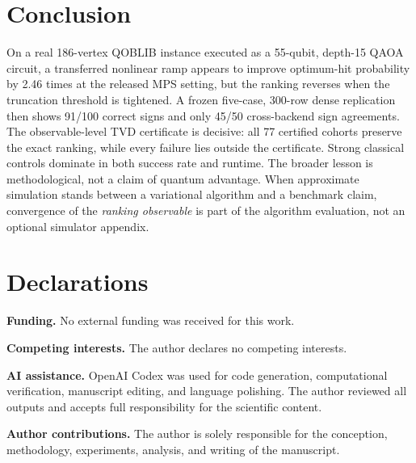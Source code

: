 \documentclass[10pt,twocolumn]{article}
\begin{document}
\section{Conclusion}

On a real 186-vertex QOBLIB instance executed as a 55-qubit, depth-15 QAOA
circuit, a transferred nonlinear ramp appears to improve optimum-hit
probability by 2.46 times at the released MPS setting, but the ranking reverses
when the truncation threshold is tightened. A frozen five-case, 300-row dense
replication then shows 91/100 correct signs and only 45/50 cross-backend sign
agreements. The observable-level TVD certificate is decisive: all 77 certified
cohorts preserve the exact ranking, while every failure lies outside the
certificate. Strong classical controls dominate in both success rate and
runtime. The broader lesson is methodological, not a claim of quantum
advantage. When approximate simulation stands between a variational algorithm
and a benchmark claim, convergence of the \emph{ranking observable} is part of
the algorithm evaluation, not an optional simulator appendix.

\section*{Declarations}

\noindent\textbf{Funding.}
No external funding was received for this work.

\noindent\textbf{Competing interests.}
The author declares no competing interests.

\noindent\textbf{AI assistance.}
OpenAI Codex was used for code generation, computational verification,
manuscript editing, and language polishing. The author reviewed all outputs
and accepts full responsibility for the scientific content.

\noindent\textbf{Author contributions.}
The author is solely responsible for the conception, methodology,
experiments, analysis, and writing of the manuscript.
\end{document}
